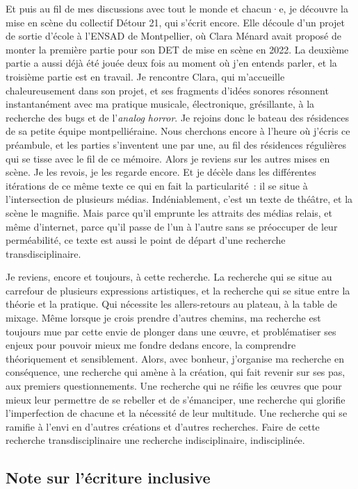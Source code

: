 \documentclass[
]{article}
\begin{document}
Et puis au fil de mes discussions avec tout le monde et chacun·e, je découvre la mise en scène du collectif Détour 21, qui s'écrit encore. Elle découle d'un projet de sortie d'école à l'ENSAD de Montpellier, où Clara Ménard avait proposé de monter la première partie pour son DET de mise en scène en 2022. La deuxième partie a aussi déjà été jouée deux fois au moment où j'en entends parler, et la troisième partie est en travail. Je rencontre Clara, qui m'accueille chaleureusement dans son projet, et ses fragments d'idées sonores résonnent instantanément avec ma pratique musicale, électronique, grésillante, à la recherche des bugs et de l'\emph{analog horror}. Je rejoins donc le bateau des résidences de sa petite équipe montpelliéraine. Nous cherchons encore à l'heure où j'écris ce préambule, et les parties s'inventent une par une, au fil des résidences régulières qui se tisse avec le fil de ce mémoire. Alors je reviens sur les autres mises en scène. Je les revois, je les regarde encore. Et je décèle dans les différentes itérations de ce même texte ce qui en fait la particularité~: il se situe à l'intersection de plusieurs médias. Indéniablement, c'est un texte de théâtre, et la scène le magnifie. Mais parce qu'il emprunte les attraits des médias relais, et même d'internet, parce qu'il passe de l'un à l'autre sans se préoccuper de leur perméabilité, ce texte est aussi le point de départ d'une recherche transdisciplinaire.

Je reviens, encore et toujours, à cette recherche. La recherche qui se situe au carrefour de plusieurs expressions artistiques, et la recherche qui se situe entre la théorie et la pratique. Qui nécessite les allers-retours au plateau, à la table de mixage. Même lorsque je crois prendre d'autres chemins, ma recherche est toujours mue par cette envie de plonger dans une œuvre, et problématiser ses enjeux pour pouvoir mieux me fondre dedans encore, la comprendre théoriquement et sensiblement. Alors, avec bonheur, j'organise ma recherche en conséquence, une recherche qui amène à la création, qui fait revenir sur ses pas, aux premiers questionnements. Une recherche qui ne réifie les œuvres que pour mieux leur permettre de se rebeller et de s'émanciper, une recherche qui glorifie l'imperfection de chacune et la nécessité de leur multitude. Une recherche qui se ramifie à l'envi en d'autres créations et d'autres recherches. Faire de cette recherche transdisciplinaire une recherche indisciplinaire, indisciplinée.

\subsection{Note sur l'écriture inclusive}\label{note-sur-luxe9criture-inclusive}
\end{document}
